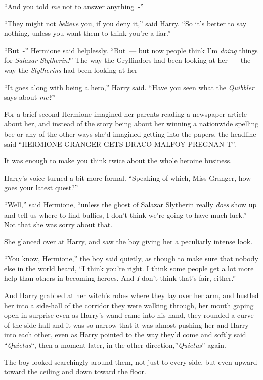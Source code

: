 ``And you told \emph{me} not to answer anything~-''

``They might not \emph{believe} you, if you deny it,'' said Harry. ``So it's better to say nothing, unless you want them to think you're a liar.''

``But~-'' Hermione said helplessly. ``But~--- but now people think I'm \emph{doing} things for \emph{Salazar Slytherin!}'' The way the Gryffindors had been looking at her~--- the way the \emph{Slytherins} had been looking at her -

``It goes along with being a hero,'' Harry said. ``Have you seen what the \emph{Quibbler} says about \emph{me?}''

For a brief second Hermione imagined her parents reading a newspaper article about her, and instead of the story being about her winning a nationwide spelling bee or any of the other ways she'd imagined getting into the papers, the headline said ``HERMIONE GRANGER GETS DRACO MALFOY PREGNAN T''.

It was enough to make you think twice about the whole heroine business.

Harry's voice turned a bit more formal. ``Speaking of which, Miss Granger, how goes your latest quest?''

``Well,'' said Hermione, ``unless the ghost of Salazar Slytherin really \emph{does} show up and tell us where to find bullies, I don't think we're going to have much luck.'' Not that she was sorry about that.

She glanced over at Harry, and saw the boy giving her a peculiarly intense look.

``You know, Hermione,'' the boy said quietly, as though to make sure that nobody else in the world heard, ``I think you're right. I think some people get a lot more help than others in becoming heroes. And \emph{I} don't think that's fair, either.''

And Harry grabbed at her witch's robes where they lay over her arm, and hustled her into a side-hall of the corridor they were walking through, her mouth gaping open in surprise even as Harry's wand came into his hand, they rounded a curve of the side-hall and it was so narrow that it was almost pushing her and Harry into each other, even as Harry pointed to the way they'd come and softly said ``\emph{Quietus}``, then a moment later, in the other direction,''\emph{Quietus}'' again.

The boy looked searchingly around them, not just to every side, but even upward toward the ceiling and down toward the floor.

